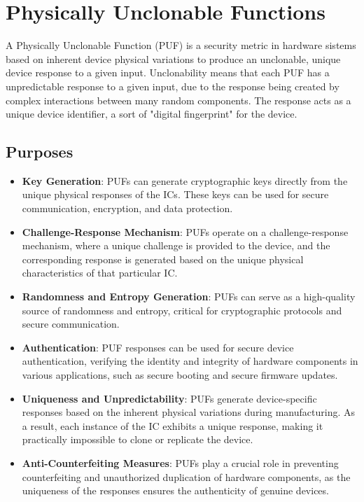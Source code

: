 \section{Physically Unclonable Functions}
A Physically Unclonable Function (PUF) is a security metric in hardware sistems based on inherent device physical variations to produce an unclonable, 
unique device response to a given input. Unclonability means that each PUF has a unpredictable response to a given input, due to the response being created by complex interactions between many random components.
The response acts as a unique device identifier, a sort of "digital fingerprint" for the device.

\subsection{Purposes} 
\begin{itemize}
\item \textbf{Key Generation}: PUFs can generate cryptographic keys directly from the unique physical responses of the ICs. These keys can be used for secure communication, encryption, and data protection.
\item \textbf{Challenge-Response Mechanism}: PUFs operate on a challenge-response mechanism, where a unique challenge is provided to the device, and the corresponding response is generated based on the unique physical characteristics of that particular IC.
\item \textbf{Randomness and Entropy Generation}: PUFs can serve as a high-quality source of randomness and entropy, critical for cryptographic protocols and secure communication.
\item \textbf{Authentication}: PUF responses can be used for secure device authentication, verifying the identity and integrity of hardware components in various applications, such as secure booting and secure firmware updates.
\item \textbf{Uniqueness and Unpredictability}: PUFs generate device-specific responses based on the inherent physical variations during manufacturing. As a result, each instance of the IC exhibits a unique response, making it practically impossible to clone or replicate the device.
\item \textbf{Anti-Counterfeiting Measures}: PUFs play a crucial role in preventing counterfeiting and unauthorized duplication of hardware components, as the uniqueness of the responses ensures the authenticity of genuine devices.
\end{itemize}

